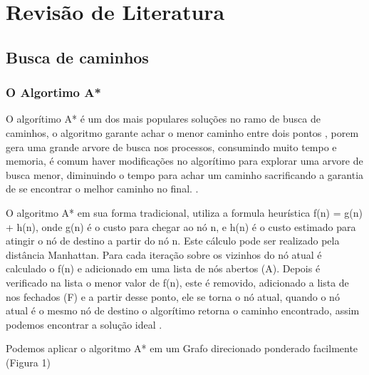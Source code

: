 \chapter[Revisão de Literatura]{Revisão de Literatura}


\section{Busca de caminhos}

\subsection{O Algortimo A*}

O algorítimo A* é um dos mais populares soluções no ramo de busca de caminhos, o algoritmo garante achar o menor caminho entre dois pontos \cite{PEHart}, porem gera uma grande arvore de busca nos processos, consumindo muito tempo e memoria, é comum haver modificações no algorítimo para explorar uma arvore de busca menor, diminuindo o tempo para achar um caminho sacrificando a garantia de se encontrar o melhor caminho no final. \cite{Botea}.

O algoritmo A* em sua forma tradicional, utiliza a formula heurística f(n) = g(n) + h(n), onde g(n) é o custo para chegar ao nó n, e h(n) é o custo estimado para atingir o nó de destino a partir do nó n. Este cálculo pode ser realizado pela distância Manhattan. Para cada iteração sobre os vizinhos do nó atual é calculado o f(n) e adicionado em uma lista de nós abertos (A). Depois é verificado na lista o menor valor de f(n), este é removido, adicionado a lista de nos fechados (F) e a partir desse ponto, ele se torna o nó atual, quando o nó atual é o mesmo nó de destino o algorítimo retorna o caminho encontrado, assim podemos encontrar a solução ideal .

Podemos aplicar o algoritmo A* em um Grafo direcionado ponderado facilmente (Figura 1)



\begin{minipage}{\linewidth}
\end{minipage}


